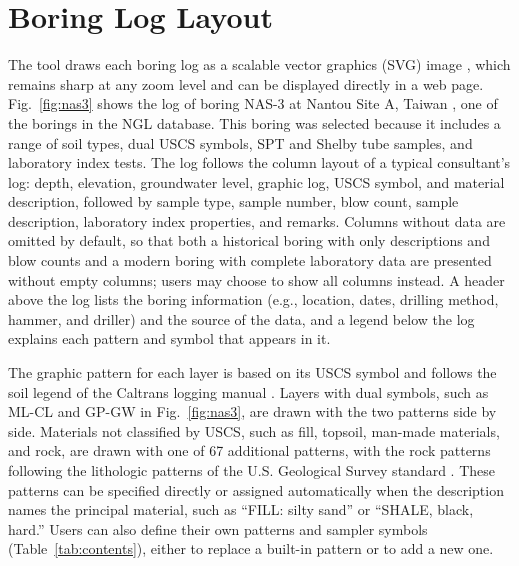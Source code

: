 \documentclass[Journal,letterpaper,InsideFigs]{ascelike-new}
\begin{document}
\FloatBarrier

\section{Boring Log Layout}

The tool draws each boring log as a scalable vector graphics (SVG) image \cite{W3C2011}, which remains sharp at any zoom level and can be displayed directly in a web page. Fig.~\ref{fig:nas3} shows the log of boring NAS-3 at Nantou Site A, Taiwan \cite{PEER2000}, one of the borings in the NGL database. This boring was selected because it includes a range of soil types, dual USCS symbols, SPT and Shelby tube samples, and laboratory index tests. The log follows the column layout of a typical consultant's log: depth, elevation, groundwater level, graphic log, USCS symbol, and material description, followed by sample type, sample number, blow count, sample description, laboratory index properties, and remarks. Columns without data are omitted by default, so that both a historical boring with only descriptions and blow counts and a modern boring with complete laboratory data are presented without empty columns; users may choose to show all columns instead. A header above the log lists the boring information (e.g., location, dates, drilling method, hammer, and driller) and the source of the data, and a legend below the log explains each pattern and symbol that appears in it.

The graphic pattern for each layer is based on its USCS symbol and follows the soil legend of the Caltrans logging manual \cite{Caltrans2010}. Layers with dual symbols, such as ML-CL and GP-GW in Fig.~\ref{fig:nas3}, are drawn with the two patterns side by side. Materials not classified by USCS, such as fill, topsoil, man-made materials, and rock, are drawn with one of 67 additional patterns, with the rock patterns following the lithologic patterns of the U.S. Geological Survey standard \cite{FGDC2006}. These patterns can be specified directly or assigned automatically when the description names the principal material, such as ``FILL: silty sand'' or ``SHALE, black, hard.'' Users can also define their own patterns and sampler symbols (Table~\ref{tab:contents}), either to replace a built-in pattern or to add a new one.
\end{document}
